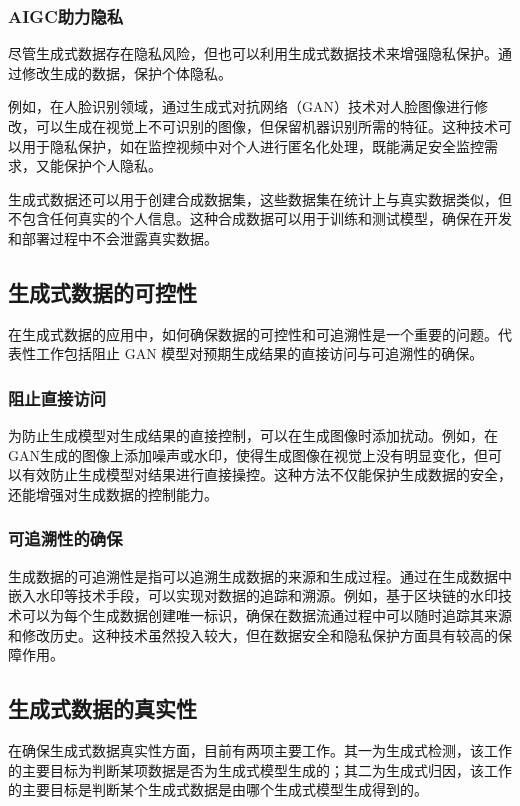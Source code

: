 \documentclass[a4paper]{nuist}
\begin{document}
\subsubsection{AIGC助力隐私}

尽管生成式数据存在隐私风险，但也可以利用生成式数据技术来增强隐私保护。通过修改生成的数据，保护个体隐私。

例如，在人脸识别领域，通过生成式对抗网络（GAN）技术对人脸图像进行修改，可以生成在视觉上不可识别的图像，但保留机器识别所需的特征。这种技术可以用于隐私保护，如在监控视频中对个人进行匿名化处理，既能满足安全监控需求，又能保护个人隐私。

生成式数据还可以用于创建合成数据集，这些数据集在统计上与真实数据类似，但不包含任何真实的个人信息。这种合成数据可以用于训练和测试模型，确保在开发和部署过程中不会泄露真实数据。

\subsection{生成式数据的可控性}

在生成式数据的应用中，如何确保数据的可控性和可追溯性是一个重要的问题。代表性工作包括阻止 GAN 模型对预期生成结果的直接访问与可追溯性的确保。

\subsubsection{阻止直接访问}

为防止生成模型对生成结果的直接控制，可以在生成图像时添加扰动。例如，在GAN生成的图像上添加噪声或水印，使得生成图像在视觉上没有明显变化，但可以有效防止生成模型对结果进行直接操控。这种方法不仅能保护生成数据的安全，还能增强对生成数据的控制能力。

\subsubsection{可追溯性的确保}

生成数据的可追溯性是指可以追溯生成数据的来源和生成过程。通过在生成数据中嵌入水印等技术手段，可以实现对数据的追踪和溯源。例如，基于区块链的水印技术可以为每个生成数据创建唯一标识，确保在数据流通过程中可以随时追踪其来源和修改历史。这种技术虽然投入较大，但在数据安全和隐私保护方面具有较高的保障作用。

\subsection{生成式数据的真实性}

在确保生成式数据真实性方面，目前有两项主要工作。其一为生成式检测，该工作的主要目标为判断某项数据是否为生成式模型生成的；其二为生成式归因，该工作的主要目标是判断某个生成式数据是由哪个生成式模型生成得到的。
\end{document}
